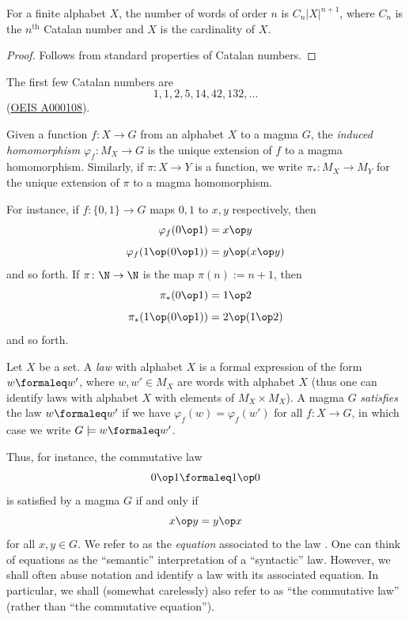 \begin{lemma} \leanok {}
  For a finite alphabet $X$, the number of words of order $n$ is $C_n |X|^{n+1}$, where $C_n$ is the $n^{\mathrm{th}}$ Catalan number and $X$ is the cardinality of $X$.
\end{lemma}

\begin{proof} \leanok
  Follows from standard properties of Catalan numbers.
\end{proof}

The first few Catalan numbers are
$$ 1, 1, 2, 5, 14, 42, 132, \dots$$
(\href{https://oeis.org/A000108}{OEIS A000108}).

\begin{definition}\label{induced-def}
  Given a function $f: X \to G$ from an alphabet $X$ to a magma $G$, the \emph{induced homomorphism} $\varphi_f: M_X \to G$ is the unique extension of $f$ to a magma homomorphism.
  Similarly, if $\pi \colon X \to Y$ is a function, we write $\pi_* \colon M_X \to M_Y$ for the unique extension of $\pi$ to a magma homomorphism.
\end{definition}

For instance, if $f : \{0,1\} \to G$ maps $0,1$ to $x,y$ respectively, then
$$ \varphi_f(0 \op 1) = x \op y$$
$$ \varphi_f(1 \op (0 \op 1)) = y \op (x \op y)$$
and so forth. If $\pi \colon \N \to \N$ is the map $\pi(n) := n+1$, then
$$ \pi_*(0 \op 1) = 1 \op 2$$
$$ \pi_*(1 \op (0 \op 1)) = 2 \op (1 \op 2)$$
and so forth.

\begin{definition}[Law]\label{law-def}
  \leanok
  Let $X$ be a set. A \emph{law} with alphabet $X$ is a formal expression of the form $w \formaleq w'$,
  where $w, w' \in M_X$ are words with alphabet $X$ (thus one can identify laws with alphabet $X$
  with elements of $M_X \times M_X$).
  A magma $G$ \emph{satisfies} the law $w \formaleq w'$ if
  we have $\varphi_f( w ) = \varphi_f ( w' )$ for all $f: X \to G$, in which case we write
  $G \models w \formaleq w'$.
\end{definition}

Thus, for instance, the commutative law
\begin{equation}\label{comm-law}
  0 \op 1 \formaleq 1 \op 0
\end{equation}
is satisfied by a magma $G$ if and only if
\begin{equation}\label{comm-law-2}
 x \op y = y \op x
\end{equation}
for all $x, y \in G$. We refer to  as the \emph{equation} associated to the law . One can think of equations as the ``semantic'' interpretation of a ``syntactic'' law. However, we shall often abuse notation and identify a law with its associated equation. In particular, we shall (somewhat carelessly) also refer to  as ``the commutative law'' (rather than ``the commutative equation'').

